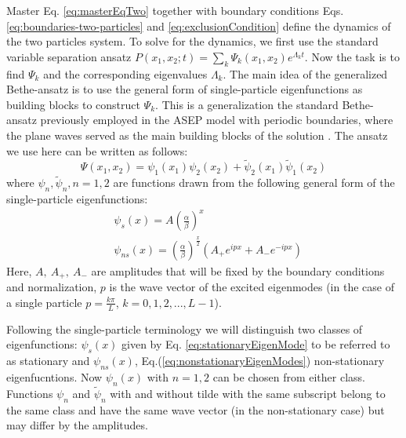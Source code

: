 \documentclass[aps,showpacs,twocolumn,floatfix,prx,superscriptaddress]{revtex4-1}
\begin{document}
Master Eq. \eqref{eq:masterEqTwo} together with boundary conditions Eqs. \eqref{eq:boundaries-two-particles} and \eqref{eq:exclusionCondition} define the dynamics of the two particles system. To solve for the dynamics, we first use the standard variable separation ansatz $P(x_1, x_2; t) = \sum_k { \Psi_k(x_1, x_2) e^{\Lambda_k t}}$. Now the task is to find $\Psi_k$ and the corresponding eigenvalues $\Lambda_k$. The main idea of the generalized Bethe-ansatz is to use the general form of single-particle eigenfunctions as building blocks to construct $\Psi_k$. This is a generalization the standard Bethe-ansatz previously employed in the ASEP model with periodic boundaries, where the plane waves served as the main building blocks of the solution \cite{}. The ansatz we use here can be written as follows:
\begin{equation}
    \label{eq:ansatzTwo}
    \Psi(x_1, x_2) = \psi_1(x_1)\psi_2(x_2) + \tilde{\psi}_2(x_1)\tilde{\psi}_1(x_2)
\end{equation}
where $\psi_n, \tilde{\psi}_n, n=1,2$ are functions drawn from the following general form of the single-particle eigenfunctions:
\begin{subequations}
    \label{eq:eigenModes}
\begin{eqnarray}
    \label{eq:stationaryEigenMode}
    &\psi_s(x)  =  A\left(\frac{\alpha}{\beta}\right)^x \\
    \label{eq:nonstationaryEigenModes}
    &\psi_{ns}(x)  =  \left(\frac{\alpha}{\beta}\right)^{\frac{x}{2}}
    \left(A_+ e^{ipx} +  A_-e^{-ipx}\right) 
\end{eqnarray}
\end{subequations}
Here, $A,~A_+,~A_-$ are amplitudes that will be fixed by the boundary conditions and normalization, $p$ is the wave vector of the excited eigenmodes (in the case of a single particle $p=\frac{k\pi}{L}$, $k=0,1,2,...,L-1$).

Following the single-particle terminology we will distinguish two classes of eigenfunctions: $\psi_s(x)$ given by Eq. \eqref{eq:stationaryEigenMode} to be referred to as stationary and $\psi_{ns}(x)$, Eq.(\ref{eq:nonstationaryEigenModes}) non-stationary eigenfucntions. Now $\psi_n(x)$ with $n=1,2$ can be chosen from either class. Functions $\psi_n$ and  $\tilde{\psi}_n$  with and without tilde with the same subscript belong to the same class and have the same wave vector (in the non-stationary case) but may differ by the amplitudes. %
\end{document}
